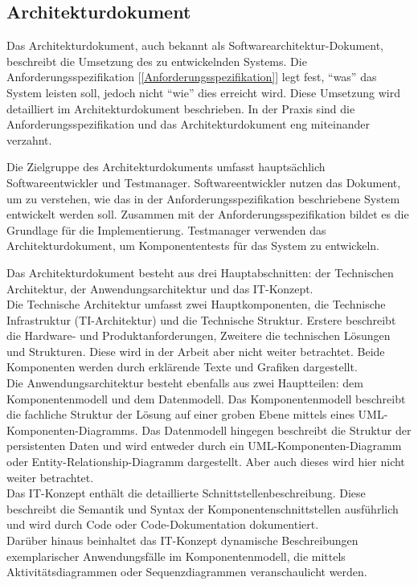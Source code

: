\subsection{Architekturdokument}  \label{Architekturdokument}

Das Architekturdokument, auch bekannt als Softwarearchitektur-Dokument, beschreibt die Umsetzung des zu entwickelnden 
Systems. Die Anforderungsspezifikation [\ref{Anforderungsspezifikation}] legt fest, ``was'' das System leisten soll, 
jedoch nicht ``wie'' dies erreicht wird. Diese Umsetzung wird detailliert im Architekturdokument beschrieben. In der 
Praxis sind die Anforderungsspezifikation und das Architekturdokument eng miteinander verzahnt.

Die Zielgruppe des Architekturdokuments umfasst hauptsächlich Softwareentwickler und Testmanager. Softwareentwickler 
nutzen das Dokument, um zu verstehen, wie das in der Anforderungsspezifikation beschriebene System entwickelt werden 
soll. Zusammen mit der Anforderungsspezifikation bildet es die Grundlage für die Implementierung. Testmanager verwenden 
das Architekturdokument, um Komponententests für das System zu entwickeln.

Das Architekturdokument besteht aus drei Hauptabschnitten: der Technischen Architektur, der Anwendungsarchitektur 
und das IT-Konzept.\\
Die Technische Architektur umfasst zwei Hauptkomponenten, die Technische Infrastruktur (TI-Architektur) und die Technische 
Struktur. Erstere beschreibt die Hardware- und Produktanforderungen, Zweitere die technischen Lösungen und Strukturen. 
Diese wird in der Arbeit aber nicht weiter betrachtet. Beide Komponenten werden durch erklärende Texte und Grafiken dargestellt.\\
Die Anwendungsarchitektur besteht ebenfalls aus zwei Hauptteilen: dem Komponentenmodell und dem Datenmodell. Das 
Komponentenmodell beschreibt die fachliche Struktur der Lösung auf einer groben Ebene mittels eines 
UML-Komponenten-Diagramms. Das Datenmodell hingegen beschreibt die Struktur der persistenten Daten und wird 
entweder durch ein UML-Komponenten-Diagramm oder Entity-Relationship-Diagramm dargestellt. Aber auch dieses wird hier 
nicht weiter betrachtet.\\
Das IT-Konzept enthält die detaillierte Schnittstellenbeschreibung. Diese beschreibt die Semantik und Syntax der 
Komponentenschnittstellen ausführlich und wird durch Code oder Code-Dokumentation dokumentiert.\\ 
Darüber hinaus beinhaltet das IT-Konzept dynamische Beschreibungen exemplarischer Anwendungsfälle im Komponentenmodell, die mittels 
Aktivitätsdiagrammen oder Sequenzdiagrammen veranschaulicht werden.

